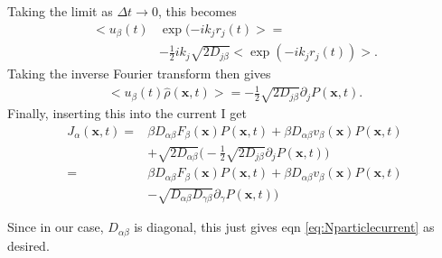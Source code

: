 \documentclass[../main.tex]{subfiles}
\begin{document}
Taking the limit as $\Delta t\to0$, this becomes
\begin{align}
  <u_{\beta}(t)&\exp(-ik_jr_j(t)>=\nonumber\\
  &-\frac{1}{2}ik_j\sqrt{2D_{j\beta}}\bigg<\exp(-ik_jr_j(t))\bigg>.
\end{align}
Taking the inverse Fourier transform then gives
\begin{align}
  <u_{\beta}(t)\hat{\rho}(\bm{x},t)>=-\frac{1}{2}\sqrt{2D_{j\beta}}
  \partial_jP(\bm{x},t).
\end{align}
Finally, inserting this into the current I get
\begin{align}
  J_{\alpha}(\bm{x},t)=
  &\beta D_{\alpha\beta}F_{\beta}(\bm{x})P(\bm{x},t)
  +\beta D_{\alpha\beta}v_{\beta}(\bm{x})P(\bm{x},t)\nonumber\\
  &+\sqrt{2D_{\alpha\beta}}\bigg(-\frac{1}{2}\sqrt{2D_{j\beta}}
  \partial_jP(\bm{x},t)\bigg)\nonumber\\
  =&\beta D_{\alpha\beta}F_{\beta}(\bm{x})P(\bm{x},t)
  +\beta D_{\alpha\beta}v_{\beta}(\bm{x})P(\bm{x},t)\nonumber\\
  &-\sqrt{D_{\alpha\beta}D_{\gamma\beta}}
  \partial_{\gamma}P(\bm{x},t))
\end{align}

Since in our case, $D_{\alpha\beta}$ is diagonal, this just gives eqn
\ref{eq:Nparticlecurrent} as desired.
\end{document}
